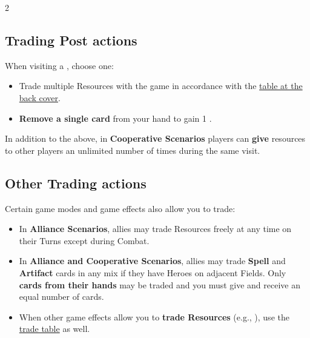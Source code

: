 
\begin{multicols}{2}

\subsection*{Trading Post actions}
When visiting a , choose one:
\begin{itemize}
  \item Trade multiple Resources with the game in accordance with the \hyperlink{Trade Table}{table at the back cover}.
  \item \textbf{Remove a single card} from your hand to gain 1 .\par
    \par
\end{itemize}

In addition to the above, in \textbf{Cooperative Scenarios} players can \textbf{give} resources to other players an unlimited number of times during the same visit.
\columnbreak

\subsection*{Other Trading actions}
Certain game modes and game effects also allow you to trade:
\begin{itemize}
  \item In \textbf{Alliance Scenarios}, allies may trade Resources freely at any time on their Turns except during Combat.
  \item In \textbf{Alliance and Cooperative Scenarios}, allies may trade \textbf{Spell} and \textbf{Artifact} cards in any mix if they have Heroes on adjacent Fields.
    Only \textbf{cards from their hands} may be traded and you must give and receive an equal number of cards.
  \item When other game effects allow you to \textbf{trade Resources} (e.g., ), use the \hyperlink{Trade Table}{trade table} as well.
\end{itemize}
\medskip


\end{multicols}

